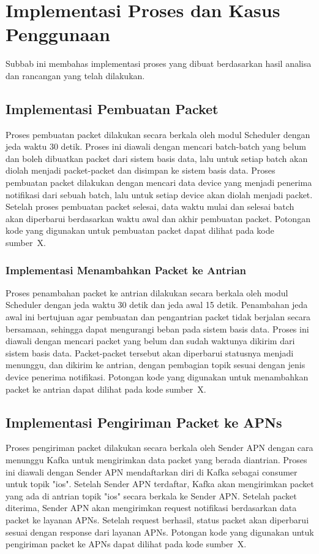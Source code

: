 \section{Implementasi Proses dan Kasus Penggunaan}
\par Subbab ini membahas implementasi proses yang dibuat berdasarkan hasil analisa dan rancangan yang telah dilakukan.

\subsection{Implementasi Pembuatan Packet}
\par Proses pembuatan packet dilakukan secara berkala oleh modul Scheduler dengan jeda waktu 30 detik. Proses ini diawali dengan mencari batch-batch yang belum dan boleh dibuatkan packet dari sistem basis data, lalu untuk setiap batch akan diolah menjadi packet-packet dan disimpan ke sistem basis data. Proses pembuatan packet dilakukan dengan mencari data device yang menjadi penerima notifikasi dari sebuah batch, lalu untuk setiap device akan diolah menjadi packet. Setelah proses pembuatan packet selesai, data waktu mulai dan selesai batch akan diperbarui berdasarkan waktu awal dan akhir pembuatan packet. Potongan kode yang digunakan untuk pembuatan packet dapat dilihat pada kode sumber~X.

\subsubsection{Implementasi Menambahkan Packet ke Antrian}
\par Proses penambahan packet ke antrian dilakukan secara berkala oleh modul Scheduler dengan jeda waktu 30 detik dan jeda awal 15 detik. Penambahan jeda awal ini bertujuan agar pembuatan dan pengantrian packet tidak berjalan secara bersamaan, sehingga dapat mengurangi beban pada sistem basis data. Proses ini diawali dengan mencari packet yang belum dan sudah waktunya dikirim dari sistem basis data. Packet-packet tersebut akan diperbarui statusnya menjadi menunggu, dan dikirim ke antrian, dengan pembagian topik sesuai dengan jenis device penerima notifikasi. Potongan kode yang digunakan untuk menambahkan packet ke antrian dapat dilihat pada kode sumber~X.

\subsection{Implementasi Pengiriman Packet ke APNs}
\par Proses pengiriman packet dilakukan secara berkala oleh Sender APN dengan cara menunggu Kafka untuk mengirimkan data packet yang berada diantrian. Proses ini diawali dengan Sender APN mendaftarkan diri di Kafka sebagai consumer untuk topik "ios". Setelah Sender APN terdaftar, Kafka akan mengirimkan packet yang ada di antrian topik "ios" secara berkala ke Sender APN. Setelah packet diterima, Sender APN akan mengirimkan request notifikasi berdasarkan data packet ke layanan APNs. Setelah request berhasil, status packet akan diperbarui sesuai dengan response dari layanan APNs. Potongan kode yang digunakan untuk pengiriman packet ke APNs dapat dilihat pada kode sumber~X.

